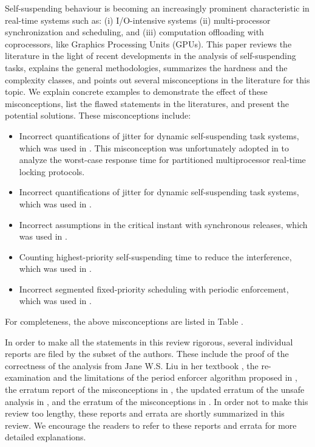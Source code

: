  Self-suspending behaviour is becoming an increasingly prominent
characteristic in real-time systems such as: (i) I/O-intensive systems
(ii) multi-processor synchronization and scheduling, and (iii)
computation offloading with coprocessors, like Graphics Processing
Units (GPUs).  This paper reviews the literature in the light of
recent developments in the analysis of self-suspending tasks,
explains the general methodologies, summarizes the hardness and
the complexity classes, and points out several 
misconceptions in the literature for this topic. We
explain concrete examples to demonstrate the effect of these
misconceptions, list the flawed statements in the literatures, and
present the potential solutions. These misconceptions include:
\begin{itemize}
\item Incorrect quantifications of jitter for dynamic self-suspending
  task systems, which was used in
  \cite{ECRTS-AudsleyB04,RTAS-AudsleyB04,RTCSA-KimCPKH95}.  This
  misconception was unfortunately adopted in
  \cite{zeng-2011,bbb-2013,yang-2013,kim-2014,han-2014,carminati-2014,yang-2014,lakshmanan-2009} to analyze the worst-case response time for
  partitioned multiprocessor real-time locking protocols.
\item Incorrect quantifications of jitter for dynamic self-suspending
  task systems, which was used in  \cite{RTCSA-BletsasA05}.
\item Incorrect assumptions in the critical instant with
  synchronous releases, which was used in \cite{LR:rtas10}.
\item Counting highest-priority self-suspending time to reduce the
  interference, which was used in  \cite{RTSS-KimANR13}. 
\item Incorrect segmented fixed-priority scheduling with periodic
  enforcement, which was used in \cite{RTSS-KimANR13,DBLP:journals/ieicet/DingTT09}.
\end{itemize}
For completeness, the above misconceptions are listed in Table .

In order to make all the statements in this review rigorous, several
individual reports are filed by the subset of the authors. These
include the proof \cite{ChenHuangNelissen} of the correctness of the
analysis from Jane W.S. Liu in her textbook \cite[Page
164-165]{Liu:2000:RS:518501}, the re-examination and the limitations
\cite{ChenBrandenburg} of the period enforcer algorithm proposed in
\cite{Raj:suspension1991}, the erratum report \cite{BletsasReport2015}
of the misconceptions in
\cite{ECRTS-AudsleyB04,RTAS-AudsleyB04,RTCSA-BletsasA05}, the updated
erratum \cite{erratu-cong-anderson} of the unsafe analysis in
\cite{erratu-cong-anderson}, and the erratum  of the
misconceptions in \cite{RTSS-KimANR13}.  In order not to make this
review too lengthy, these reports and errata are shortly summarized in
this review. We encourage the readers to refer to these reports and
errata for more detailed explanations.


